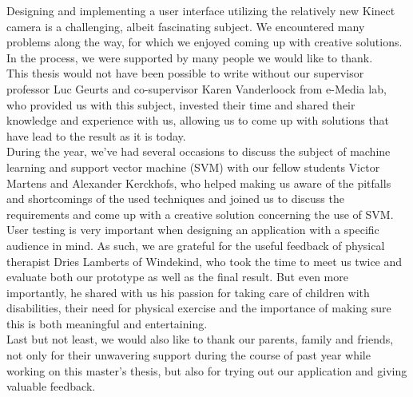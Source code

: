 Designing and implementing a user interface utilizing the relatively new Kinect camera is a challenging, albeit fascinating subject. We encountered many problems along the way, for which we enjoyed coming up with creative solutions. In the process, we were supported by many people we would like to thank.\\

This thesis would not have been possible to write without our supervisor professor Luc Geurts and co-supervisor Karen Vanderloock from e-Media lab, who provided us with this subject, invested their time and shared their knowledge and experience with us, allowing us to come up with solutions that have lead to the result as it is today.\\

During the year, we've had several occasions to discuss the subject of machine learning and support vector machine (SVM) with our fellow students Victor Martens and Alexander Kerckhofs, who helped making us aware of the pitfalls and shortcomings of the used techniques and joined us to discuss the requirements and come up with a creative solution concerning the use of SVM.\\

User testing is very important when designing an application with a specific audience in mind. As such, we are grateful for the useful feedback of physical therapist Dries Lamberts of Windekind, who took the time to meet us twice and evaluate both our prototype as well as the final result. But even more importantly, he shared with us his passion for taking care of children with disabilities, their need for physical exercise and the importance of making sure this is both meaningful and entertaining.\\

Last but not least, we would also like to thank our parents, family and friends, not only for their unwavering support during the course of past year while working on this master's thesis, but also for trying out our application and giving valuable feedback.